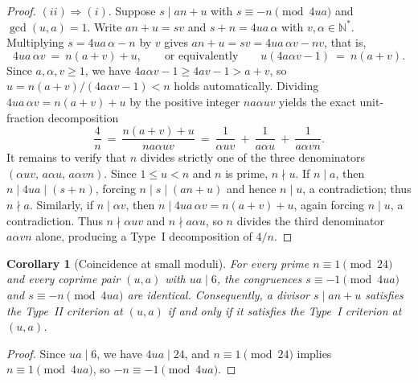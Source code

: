 \documentclass[11pt, a4paper]{article}
\theoremstyle{plain}
\newtheorem{corollary}[theorem]{Corollary}
\theoremstyle{definition}
\newcommand{\N}{\mathbb{N}}
\begin{document}
\begin{proof}
$(ii)\Rightarrow(i)$. Suppose $s\mid an+u$ with $s\equiv-n\pmod{4ua}$ and $\gcd(u,a)=1$. Write $an+u=sv$ and $s+n=4ua\,\alpha$ with $v,\alpha\in\N^{\ast}$. Multiplying $s=4ua\,\alpha-n$ by $v$ gives $an+u=sv=4ua\,\alpha v-nv$, that is,
$$4ua\,\alpha v\ =\ n(a+v)+u,\qquad\text{or equivalently}\qquad u(4a\alpha v-1)\ =\ n(a+v).$$
Since $a,\alpha,v\ge1$, we have $4a\alpha v-1\ge 4av-1>a+v$, so $u=n(a+v)/(4a\alpha v-1)<n$ holds automatically. Dividing $4ua\,\alpha v=n(a+v)+u$ by the positive integer $n a\alpha u v$ yields the exact unit-fraction decomposition
$$\frac{4}{n}\ =\ \frac{n(a+v)+u}{n a\alpha u v}\ =\ \frac{1}{\alpha u v}\ +\ \frac{1}{a\alpha u}\ +\ \frac{1}{a\alpha v n}.$$
It remains to verify that $n$ divides strictly one of the three denominators $(\alpha u v,\,a\alpha u,\,a\alpha v n)$. Since $1\le u<n$ and $n$ is prime, $n\nmid u$. If $n\mid a$, then $n\mid 4ua\mid(s+n)$, forcing $n\mid s\mid(an+u)$ and hence $n\mid u$, a contradiction; thus $n\nmid a$. Similarly, if $n\mid\alpha v$, then $n\mid 4ua\,\alpha v=n(a+v)+u$, again forcing $n\mid u$, a contradiction. Thus $n\nmid\alpha u v$ and $n\nmid a\alpha u$, so $n$ divides the third denominator $a\alpha v n$ alone, producing a Type~I decomposition of $4/n$.
\end{proof}

\begin{corollary}[Coincidence at small moduli]\label{cor:coincidence_ua_div_6}
For every prime $n\equiv1\pmod{24}$ and every coprime pair $(u,a)$ with $ua\mid 6$, the congruences $s\equiv-1\pmod{4ua}$ and $s\equiv-n\pmod{4ua}$ are identical. Consequently, a divisor $s\mid an+u$ satisfies the Type~II criterion at $(u,a)$ if and only if it satisfies the Type~I criterion at $(u,a)$.
\end{corollary}
\begin{proof}
Since $ua\mid 6$, we have $4ua\mid 24$, and $n\equiv1\pmod{24}$ implies $n\equiv1\pmod{4ua}$, so $-n\equiv-1\pmod{4ua}$.
\end{proof}
\end{document}
